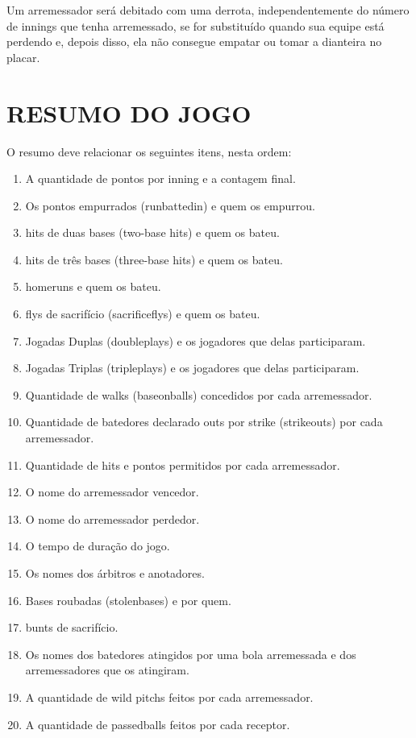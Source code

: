 		 Um arremessador será debitado com uma derrota, independentemente do número de \glspl{inning} que tenha arremessado, se for substituído quando sua equipe está perdendo e, depois disso, ela não consegue empatar ou tomar a dianteira no placar.

	\section{RESUMO DO JOGO}

		O resumo deve relacionar os seguintes itens, nesta ordem:
		\begin{enumerate}[label=(\alph*)]
			\item A quantidade de pontos por \gls{inning} e a contagem final.
			\item Os pontos empurrados (\gls{runbattedin}) e quem os empurrou.
			\item \glspl{hit} de duas bases (\glspl{two-base hit}) e quem os bateu.
			\item \glspl{hit} de três bases (\glspl{three-base hit}) e quem os bateu.
			\item \glspl{homerun} e quem os bateu.
			\item \glspl{fly} de sacrifício (\glspl{sacrificefly}) e quem os bateu.
			\item Jogadas Duplas (\glspl{doubleplay}) e os jogadores que delas participaram.
			\item Jogadas Triplas (\glspl{tripleplay}) e os jogadores que delas participaram.
			\item Quantidade de \glspl{walk} (\gls{baseonballs}) concedidos por cada arremessador.
			\item Quantidade de batedores declarado \gls{out}s por \gls{strike} (\glspl{strikeout}) por cada arremessador.
			\item Quantidade de \glspl{hit} e pontos permitidos por cada arremessador.
			\item O nome do arremessador vencedor.
			\item O nome do arremessador perdedor.
			\item O tempo de duração do jogo.
			\item Os nomes dos árbitros e anotadores.
			\item Bases roubadas (\glspl{stolenbase}) e por quem.
			\item \glspl{bunt} de sacrifício.
			\item Os nomes dos batedores atingidos por uma bola arremessada e dos arremessadores que os atingiram.
			\item A quantidade de \glspl{wild pitch} feitos por cada arremessador.
			\item A quantidade de \glspl{passedball} feitos por cada receptor.
		 \end{enumerate}

